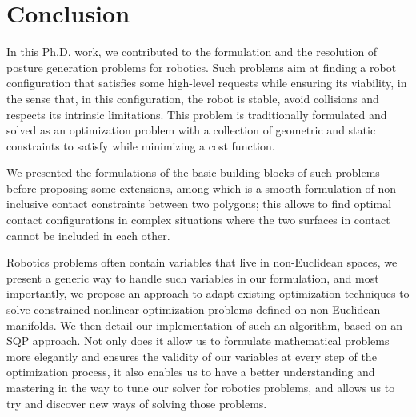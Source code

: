

\chapter*{Conclusion}
\label{cha:conclusion}

In this Ph.D. work, we contributed to the formulation and the resolution of posture generation problems for robotics.
Such problems aim at finding a robot configuration that satisfies some high-level requests while ensuring its viability, in the sense that, in this configuration, the robot is stable, avoid collisions and respects its intrinsic limitations.
This problem is traditionally formulated and solved as an optimization problem with a collection of geometric and static constraints to satisfy while minimizing a cost function.

We presented the formulations of the basic building blocks of such problems before proposing some extensions, among which is a smooth formulation of non-inclusive contact constraints between two polygons; this allows to find optimal contact configurations in complex situations where the two surfaces in contact cannot be included in each other.

Robotics problems often contain variables that live in non-Euclidean spaces, we present a generic way to handle such variables in our formulation, and most importantly, we propose an approach to adapt existing optimization techniques to solve constrained nonlinear optimization problems defined on non-Euclidean manifolds.
We then detail our implementation of such an algorithm, based on an SQP approach.
Not only does it allow us to formulate mathematical problems more elegantly and ensures the validity of our variables at every step of the optimization process, it also enables us to have a better understanding and mastering in the way to tune our solver for robotics problems, and allows us to try and discover new ways of solving those problems.

